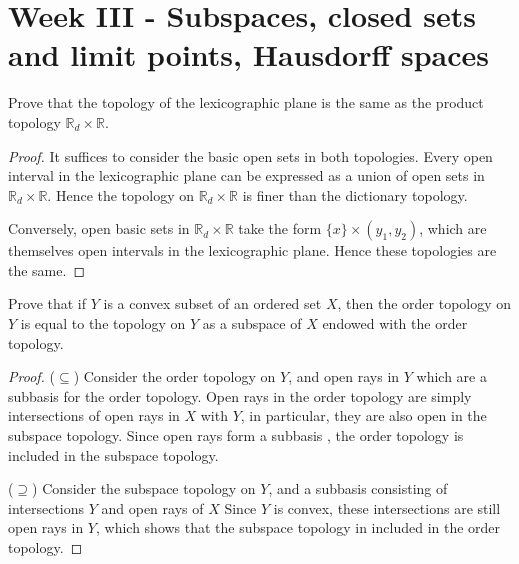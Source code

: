 \documentclass[../main.tex]{subfiles}
\begin{document}
\section{Week III - Subspaces, closed sets and limit points, Hausdorff spaces}

\begin{problem}
    Prove that the topology of the lexicographic plane is the same as the product topology $\mathbb{R}_d \times \mathbb{R}$.
\end{problem}
\begin{proof}
    It suffices to consider the basic open sets in both topologies.
    Every open interval in the lexicographic plane can be expressed as a union of open sets in $\mathbb{R}_d \times \mathbb{R}$.
    Hence the topology on $\mathbb{R}_d \times \mathbb{R}$ is finer than the dictionary topology.

    Conversely, open basic sets in $\mathbb{R}_d \times \mathbb{R}$ take the form $\{ x \} \times (y_1, y_2)$, which are themselves open intervals in the lexicographic plane.
    Hence these topologies are the same.
\end{proof}

\begin{problem}
    Prove that if $Y$ is a convex
    subset of an ordered set $X$, then the order topology on $Y$ is equal to the topology on $Y$ as a subspace of $X$ endowed with the order topology.
\end{problem}
\begin{proof}
    ($\subseteq$) Consider the order topology on $Y$, and open rays in $Y$ which are a subbasis for the order topology.
    Open rays in the order topology are simply intersections of open rays in $X$ with $Y$, in particular, they are also open in the subspace topology. 
    Since open rays form a subbasis
    ,
    the order topology is included in the subspace topology.

    ($\supseteq$) Consider the subspace topology on $Y$, and a subbasis consisting of intersections $Y$ and open rays of $X$
    Since $Y$ is convex, these intersections are still open rays in $Y$, which shows that the subspace topology in included in the order topology.
\end{proof}
\end{document}
